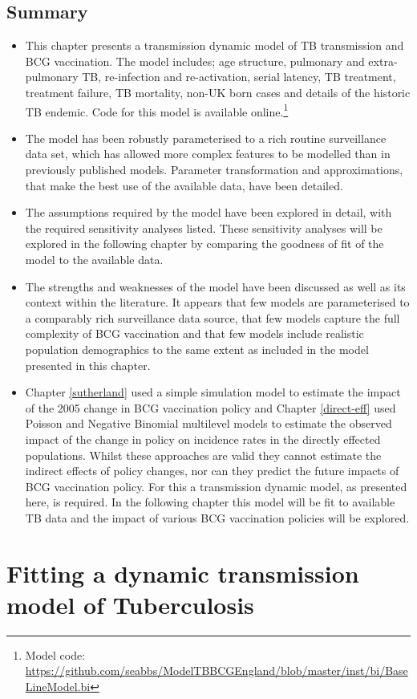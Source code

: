 \documentclass[11pt,twoside]{bristolthesis}
\begin{document}
  \hypertarget{summary-7}{%
  \section{Summary}\label{summary-7}}
  \begin{itemize}
  \item
    This chapter presents a transmission dynamic model of TB transmission and BCG vaccination. The model includes; age structure, pulmonary and extra-pulmonary TB, re-infection and re-activation, serial latency, TB treatment, treatment failure, TB mortality, non-UK born cases and details of the historic TB endemic. Code for this model is available online.\footnote{Model code: \url{https://github.com/seabbs/ModelTBBCGEngland/blob/master/inst/bi/BaseLineModel.bi}}
  \item
    The model has been robustly parameterised to a rich routine surveillance data set, which has allowed more complex features to be modelled than in previously published models. Parameter transformation and approximations, that make the best use of the available data, have been detailed.
  \item
    The assumptions required by the model have been explored in detail, with the required sensitivity analyses listed. These sensitivity analyses will be explored in the following chapter by comparing the goodness of fit of the model to the available data.
  \item
    The strengths and weaknesses of the model have been discussed as well as its context within the literature. It appears that few models are parameterised to a comparably rich surveillance data source, that few models capture the full complexity of BCG vaccination and that few models include realistic population demographics to the same extent as included in the model presented in this chapter.
  \item
    Chapter \ref{sutherland} used a simple simulation model to estimate the impact of the 2005 change in BCG vaccination policy and Chapter \ref{direct-eff} used Poisson and Negative Binomial multilevel models to estimate the observed impact of the change in policy on incidence rates in the directly effected populations. Whilst these approaches are valid they cannot estimate the indirect effects of policy changes, nor can they predict the future impacts of BCG vaccination policy. For this a transmission dynamic model, as presented here, is required. In the following chapter this model will be fit to available TB data and the impact of various BCG vaccination policies will be explored.
  \end{itemize}
  \hypertarget{model-fitting}{%
  \chapter{Fitting a dynamic transmission model of Tuberculosis}\label{model-fitting}}
  
\end{document}
